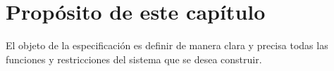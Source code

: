 \section{Propósito de este capítulo}

El objeto de la especificación es definir de manera clara y precisa todas las funciones y restricciones del sistema que se desea construir.
